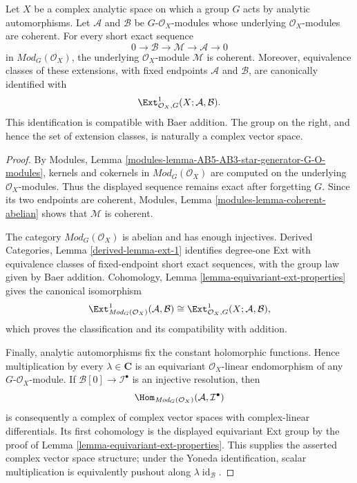 \begin{lemma}
\label{lemma-coherent-equivariant-analytic-extension-classes}
\begin{reference}
\cite[Chapter V, \S 5.6, p. 219]{Tohoku}
\end{reference}
Let $X$ be a complex analytic space on which a group $G$ acts by analytic
automorphisms. Let $\mathcal A$ and $\mathcal B$ be $G$-$\mathcal O_X$-modules
whose underlying $\mathcal O_X$-modules are coherent. For every short exact
sequence
$$
0 \longrightarrow \mathcal B \longrightarrow \mathcal M
\longrightarrow \mathcal A \longrightarrow 0
$$
in $\textit{Mod}_G(\mathcal O_X)$, the underlying $\mathcal O_X$-module
$\mathcal M$ is coherent. Moreover, equivalence classes of these extensions,
with fixed endpoints $\mathcal A$ and $\mathcal B$, are canonically identified
with
$$
\Ext^1_{\mathcal O_X,G}(X;\mathcal A,\mathcal B).
$$
This identification is compatible with Baer addition. The group on the right,
and hence the set of extension classes, is naturally a complex vector space.
\end{lemma}

\begin{proof}
By Modules, Lemma
\ref{modules-lemma-AB5-AB3-star-generator-G-O-modules}, kernels and cokernels
in $\textit{Mod}_G(\mathcal O_X)$ are computed on the underlying
$\mathcal O_X$-modules. Thus the displayed sequence remains exact after
forgetting $G$. Since its two endpoints are coherent, Modules, Lemma
\ref{modules-lemma-coherent-abelian} shows that $\mathcal M$ is coherent.

The category $\textit{Mod}_G(\mathcal O_X)$ is abelian and has enough
injectives. Derived Categories, Lemma \ref{derived-lemma-ext-1} identifies
degree-one Ext with equivalence classes of fixed-endpoint short exact
sequences, with the group law given by Baer addition. Cohomology, Lemma
\ref{lemma-equivariant-ext-properties} gives the canonical isomorphism
$$
\Ext^1_{\textit{Mod}_G(\mathcal O_X)}(\mathcal A,\mathcal B)
\cong
\Ext^1_{\mathcal O_X,G}(X;\mathcal A,\mathcal B),
$$
which proves the classification and its compatibility with addition.

Finally, analytic automorphisms fix the constant holomorphic functions. Hence
multiplication by every $\lambda\in\mathbf C$ is an equivariant
$\mathcal O_X$-linear endomorphism of any $G$-$\mathcal O_X$-module. If
$\mathcal B[0]\to\mathcal I^\bullet$ is an injective resolution, then
$$
\Hom_{\textit{Mod}_G(\mathcal O_X)}
(\mathcal A,\mathcal I^\bullet)
$$
is consequently a complex of complex vector spaces with complex-linear
differentials. Its first cohomology is the displayed equivariant Ext group by
the proof of Lemma \ref{lemma-equivariant-ext-properties}. This supplies the
asserted complex vector space structure; under the Yoneda identification,
scalar multiplication is equivalently pushout along
$\lambda\operatorname{id}_{\mathcal B}$.
\end{proof}

